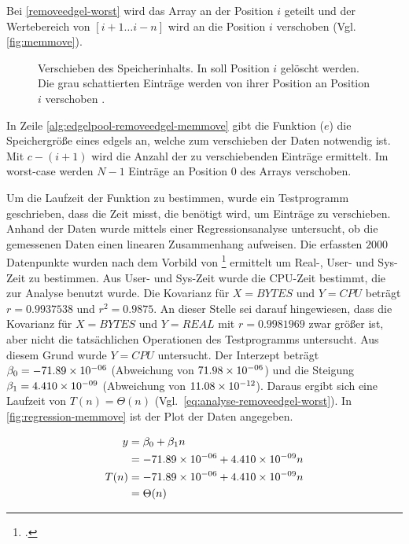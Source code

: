 Bei \autoref{removeedgel-worst} wird das Array an der Position $i$ geteilt und der Wertebereich von $[i+1 \dotsc i-n]$
 wird an die Position $i$ verschoben (Vgl. \autoref{fig:memmove}).

\begin{figure}[!ht]
	\centering
	\subfigure[]{
		
		\label{fig:memmove-before}
	}
	\subfigure[]{
		
		\label{fig:memmove-after}
	}
	\caption{Verschieben des Speicherinhalts. In  soll Position $i$ gelöscht werden. Die
	 grau schattierten Einträge werden von ihrer Position an Position $i$ verschoben .}
	\label{fig:memmove}
\end{figure}

In Zeile \ref{alg:edgelpool-removeedgel-memmove} gibt die Funktion ($e$) die Speichergröße eines
 \glspl{edgel} an, welche zum verschieben der Daten notwendig ist. Mit $c - (i + 1)$ wird die Anzahl der zu
 verschiebenden Einträge ermittelt. Im worst-case werden $N-1$ Einträge an Position $0$ des Arrays verschoben.

Um die Laufzeit der Funktion  zu bestimmen, wurde ein Testprogramm geschrieben, dass die Zeit misst,
 die benötigt wird, um Einträge zu verschieben. Anhand der Daten wurde mittels einer Regressionsanalyse untersucht, ob
 die gemessenen Daten einen linearen Zusammenhang aufweisen. Die erfassten $2000$ Datenpunkte wurden nach dem Vorbild
 von \footcite{time-1} ermittelt um Real-, User- und Sys-Zeit zu bestimmen. Aus User- und Sys-Zeit wurde
 die CPU-Zeit bestimmt, die zur Analyse benutzt wurde. Die Kovarianz für $X = \mathit{BYTES}$ und $Y = \mathit{CPU}$
 beträgt $r = 0.9937538$ und $r^2 = 0.9875$. An dieser Stelle sei darauf hingewiesen, dass die Kovarianz für
 $X = \mathit{BYTES}$ und $Y = \mathit{REAL}$ mit $r = 0.9981969$ zwar größer ist, aber nicht die tatsächlichen
 Operationen des Testprogramms untersucht. Aus diesem Grund wurde $Y = \mathit{CPU}$ untersucht. Der Interzept beträgt
 $\beta_0 = -71.89\times 10^{-06}$ (Abweichung von $71.98\times 10^{-06}$) und die Steigung $\beta_1 = 4.410\times 10^{-09}$ (Abweichung von
 $11.08\times 10^{-12}$). Daraus ergibt sich eine Laufzeit von $T(n) =\Theta(n)$ (Vgl.~\autoref{eq:analyse-removeedgel-worst}).
 In \autoref{fig:regression-memmove} ist der Plot der Daten angegeben.

\begin{equation}
	\label{eq:analyse-removeedgel-worst}
	\begin{split}
		y& = \beta_0 + \beta_1n\\
		 & = -71.89\times 10^{-06} + 4.410\times 10^{-09}n\\
		T(n)& = -71.89\times 10^{-06} + 4.410\times 10^{-09}n\\
		 & = \Theta(n)
	\end{split}
\end{equation}

